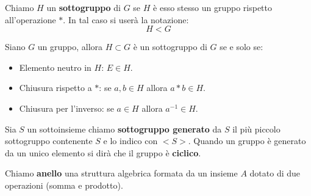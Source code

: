 \begin{definition}
	Chiamo $H$ un \textbf{sottogruppo} di $G$ se $H$ \`e esso stesso un gruppo rispetto
	all'operazione $*$. In tal caso si user\`a la notazione:
	\begin{equation*}
		H < G
	\end{equation*}
\end{definition}

\begin{theorem}
	Siano $G$ un gruppo, allora $H \subset G$ \`e un sottogruppo di $G$ se e solo se:
	\begin{itemize}
		\item Elemento neutro in $H$: $E \in H$.
		\item Chiusura rispetto a $*$: se $a, b \in H$ allora $a * b \in H$.
		\item Chiusura per l'inverso: se $a \in H$ allora $a^{-1} \in H$.
	\end{itemize}
\end{theorem}

\begin{definition}
	Sia $S$ un sottoinsieme chiamo \textbf{sottogruppo generato} da $S$ il pi\`u piccolo
	sottogruppo contenente $S$ e lo indico con $<S>$. Quando un gruppo \`e generato da un
	unico elemento si dir\`a che il gruppo \`e \textbf{ciclico}.
\end{definition}

\begin{definition}
	Chiamo \textbf{anello} una struttura algebrica formata da un insieme $A$ dotato di due
	operazioni (somma e prodotto).
\end{definition}

